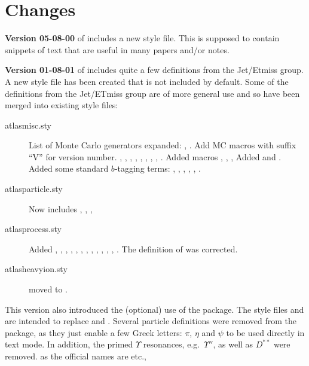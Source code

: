\onecolumn
\section{Changes}
\label{sec:change}

\textbf{Version 05-08-00} of  includes a new  style file.
This is supposed to contain snippets of text that are useful in many papers and/or notes.

\textbf{Version 01-08-01} of  includes quite a few definitions from the Jet/Etmiss group.
A new style file has been created  that is not included by default.
Some of the definitions from the Jet/ETmiss group are of more general use and so have been merged into existing style files:
\begin{description}
\item[atlasmisc.sty] List of Monte Carlo generators expanded:
  , .
  Add MC macros with suffix \enquote{V} for version number.
  , , , , , , ,
  , .
  Added macros , , ,
  Added  and .
  Added some standard $b$-tagging terms:
  , , , , , .
\item[atlasparticle.sty] Now includes , , ,
\item[atlasprocess.sty] Added , ,
  , , , ,
  , ,
  , , ,
  , .
  The definition of  was corrected.
\item[atlasheavyion.sty]  moved to .
\end{description}

This version also introduced the (optional) use of the  package.
The style files  and 
are intended to replace  and .
Several particle definitions were removed from the  package,
as they just enable a few Greek letters: $\pi$, $\eta$ and $\psi$ to be used directly in text mode.
In addition, the primed $\Upsilon$ resonances, e.g.\ $\Upsilon''$,
as well as $D^{**}$ were removed.
as the official names are  etc.,

